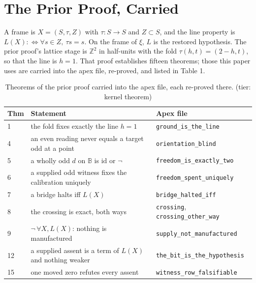 \documentclass[10pt]{article}
\begin{document}
\hypertarget{the-prior-proof-carried}{%
\section{The Prior Proof, Carried}\label{the-prior-proof-carried}}

A frame is \(X = (S, \tau, Z)\) with \(\tau : S \to S\) and
\(Z \subset S\), and the line property is
\(L(X) :\Leftrightarrow \forall s \in Z,\ \tau s = s\). On the frame of
\(\xi\), \(L\) is the restored hypothesis. The prior proof's lattice
stage is \(\mathbb{Z}^2\) in half-units with the fold
\(\tau(h, t) = (2 - h, t)\), so that the line is \(h = 1\). That proof
establishes fifteen theorems; those this paper uses are carried into the
apex file, re-proved, and listed in Table 1.

\begin{table}[H]
\scriptsize
\caption{Theorems of the prior proof \cite{islamspine} carried into the apex file, each re-proved there. (tier: kernel theorem)}
\begin{tabular}{@{}p{}p{}p{}@{}}
\toprule
Thm & Statement & Apex file \\
\midrule
1 & the fold fixes exactly the line $h = 1$ & \texttt{ground\_\allowbreak is\_\allowbreak the\_\allowbreak line} \\
4 & an even reading never equals a target odd at a point & \texttt{orientation\_\allowbreak blind} \\
5 & a wholly odd $d$ on $\mathbb{B}$ is $\mathrm{id}$ or $\neg$ & \texttt{freedom\_\allowbreak is\_\allowbreak}\allowbreak\texttt{exactly\_\allowbreak two} \\
6 & a supplied odd witness fixes the calibration uniquely & \texttt{freedom\_\allowbreak spent\_\allowbreak}\allowbreak\texttt{uniquely} \\
7 & a bridge halts iff $L(X)$ & \texttt{bridge\_\allowbreak halted\_\allowbreak iff} \\
8 & the crossing is exact, both ways & \texttt{crossing}, \texttt{crossing\_\allowbreak other\_\allowbreak way} \\
9 & $\neg\,\forall X, L(X)$: nothing is manufactured & \texttt{supply\_\allowbreak not\_\allowbreak}\allowbreak\texttt{manufactured} \\
12 & a supplied assent is a term of $L(X)$ and nothing weaker & \texttt{the\_\allowbreak bit\_\allowbreak is\_\allowbreak}\allowbreak\texttt{the\_\allowbreak hypothesis} \\
15 & one moved zero refutes every assent & \texttt{witness\_\allowbreak row\_\allowbreak}\allowbreak\texttt{falsifiable} \\
\bottomrule
\end{tabular}
\end{table}
\end{document}
